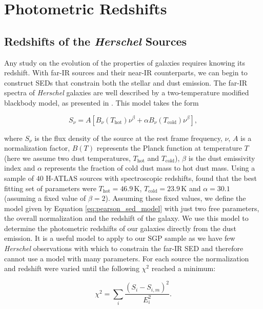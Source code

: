 \section{Photometric Redshifts}

\subsection{Redshifts of the \textit{Herschel} Sources}
\label{sec:phot_z_Herschel}

Any study on the evolution of the properties of galaxies requires knowing its redshift. With far-IR sources and their near-IR counterparts, we can begin to construct SEDs that constrain both the stellar and dust emission. The far-IR spectra of \textit{Herschel} galaxies are well described by a two-temperature modified blackbody model, as presented in \citealt{Pearson_2013}. This model takes the form 

\begin{equation}
    S_\nu = A[B_\nu(T_{\textrm{hot}})\nu^\beta + \alpha B_\nu(T_{\textrm{cold}})\nu^\beta],
\label{eq:pearson_sed_model}
\end{equation}

\noindent where $S_\nu$ is the flux density of the source at the rest frame frequency, $\nu$, $A$ is a normalization factor, $B(T)$ represents the Planck function at temperature $T$ (here we assume two dust temperatures, $T_{\textrm{hot}}$ and $T_{\textrm{cold}}$), $\beta$ is the dust emissivity index and $\alpha$ represents the fraction of cold dust mass to hot dust mass. Using a sample of $40$ H-ATLAS sources with spectroscopic redshifts, \citealt{Pearson_2013} found that the best fitting set of parameters were $T_{\textrm{hot}} = 46.9\,$K, $T_{\textrm{cold}} = 23.9\,$K and $\alpha = 30.1$ (assuming a fixed value of $\beta = 2$). Assuming these fixed values, we define the model given by Equation \ref{eq:pearson_sed_model} with just two free parameters, the overall normalization and the redshift of the galaxy. We use this model to determine the photometric redshifts of our galaxies directly from the dust emission. It is a useful model to apply to our SGP sample as we have few \textit{Herschel} observations with which to constrain the far-IR SED and therefore cannot use a model with many parameters. For each source the normalization and redshift were varied until the following $\chi^2$ reached a minimum:

\begin{equation}
    \chi^2 = \sum_i \frac{(S_i - S_{i,m})^2}{E_i^2}.
    \label{eq:chi_squared}
\end{equation}


